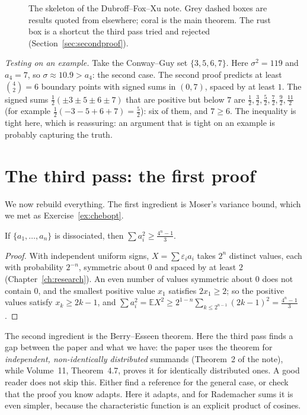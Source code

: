 \begin{figure}[ht]
\centering
{}
\caption{The skeleton of the Dubroff--Fox--Xu note. Grey dashed boxes are results quoted from elsewhere; coral is the main theorem. The rust
box is a shortcut the third pass tried and rejected (Section~\ref{sec:secondproof}).}
\label{fig:skeleton}
\end{figure}

\emph{Testing on an example.} Take the Conway--Guy set $\{3,5,6,7\}$. Here $\sigma^2=119$ and $a_4=7$, so $\sigma\approx10.9>a_4$: the second case. The second proof
predicts at least $\binom42=6$ boundary points with signed sums in $(0,7)$, spaced by at least $1$. The signed sums $\frac12(\pm3\pm5\pm6\pm7)$ that are positive but below $7$
are $\frac12,\frac32,\frac52,\frac72,\frac92,\frac{11}2$ (for example $\frac12(-3-5+6+7)=\frac52$): six of them, and $7\ge6$. The inequality is tight here, which is reassuring:
an argument that is tight on an example is probably capturing the truth.

\section{The third pass: the first proof}

We now rebuild everything. The first ingredient is Moser's variance bound, which we met as Exercise~\ref{ex:chebopt}.

\begin{lemma}[Moser]\label{lem:moser}
If $\{a_1,\dots,a_n\}$ is dissociated, then $\sum a_i^2\ge\frac{4^n-1}3$.
\end{lemma}

\begin{proof}
With independent uniform signs, $X=\sum\varepsilon_ia_i$ takes $2^n$ distinct values, each with probability $2^{-n}$, symmetric about $0$ and spaced by at least $2$
(Chapter~\ref{ch:research}). An even number of values symmetric about $0$ does not contain $0$, and the smallest positive value $x_1$ satisfies $2x_1\ge2$; so
the positive values satisfy $x_k\ge2k-1$, and $\sum a_i^2=\mathbb EX^2\ge2^{1-n}\sum_{k\le2^{n-1}}(2k-1)^2=\frac{4^n-1}3$.
\end{proof}

The second ingredient is the Berry--Esseen theorem. Here the third pass finds a gap between the paper and what we have: the paper uses the
theorem for \emph{independent, non-identically distributed} summands (Theorem~2 of the note), while Volume~11, Theorem~4.7, proves it for identically
distributed ones. A good reader does not skip this. Either find a reference for the general case, or check that the proof you know adapts. Here
it adapts, and for Rademacher sums it is even simpler, because the characteristic function is an explicit product of cosines.

